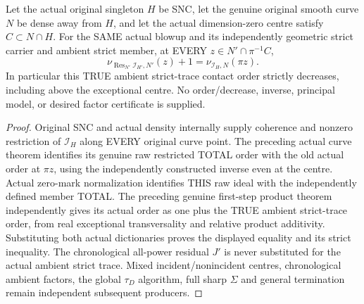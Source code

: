 \begin{theorem}
\label{hir:sharp-actual-first-curve-ambient-strict-contact-drop}
\leanok
Let the actual original singleton $H$ be SNC, let the genuine original
smooth curve $N$ be dense away from $H$, and let the actual dimension-zero
centre satisfy $C\subset N\cap H$. For the SAME actual blowup and its
independently geometric strict carrier and ambient strict member, at EVERY
$z\in N'\cap\pi^{-1}C$,
\[
 \nu_{\operatorname{Res}_{N'}\mathcal I_{H'},N'}(z)+1
   =\nu_{\mathcal I_H,N}(\pi z).
\]
In particular this TRUE ambient strict-trace contact order strictly
decreases, including above the exceptional centre. No order/decrease,
inverse, principal model, or desired factor certificate is supplied.
\end{theorem}
\begin{proof}
Original SNC and actual density internally supply coherence and nonzero
restriction of $\mathcal I_H$ along EVERY original curve point. The
preceding actual curve theorem identifies its genuine raw restricted
TOTAL order with the old actual order at $\pi z$, using the independently
constructed inverse even at the centre. Actual zero-mark normalization
identifies THIS raw ideal with the independently defined member TOTAL.
The preceding genuine first-step product theorem independently gives its
actual order as one plus the TRUE ambient strict-trace order, from real
exceptional transversality and relative product additivity. Substituting
both actual dictionaries proves the displayed equality and its strict
inequality. The chronological all-power residual $J'$ is never substituted
for the actual ambient strict trace. Mixed incident/nonincident centres,
chronological ambient factors, the global $\tau_D$ algorithm, full sharp
$\Sigma$ and general termination remain independent subsequent producers.
\end{proof}
